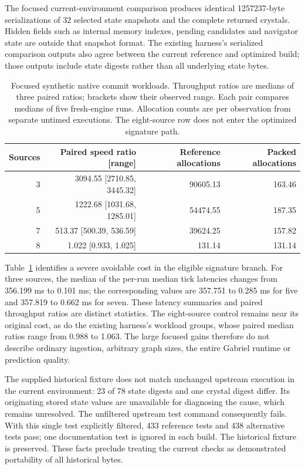 \documentclass[11pt,a4paper]{article}
\theoremstyle{definition}\newtheorem{definition}[theorem]{Definition}
\begin{document}
The focused current-environment comparison produces identical 1257237-byte serializations of 32 selected state snapshots and the complete returned crystals. Hidden fields such as internal memory indexes, pending candidates and navigator state are outside that snapshot format. The existing harness's serialized comparison outputs also agree between the current reference and optimized build; those outputs include state digests rather than all underlying state bytes.

\begin{table}[H]
\centering\small
\caption{Focused synthetic native commit workloads. Throughput ratios are medians of three paired ratios; brackets show their observed range. Each pair compares medians of five fresh-engine runs. Allocation counts are per observation from separate untimed executions. The eight-source row does not enter the optimized signature path.}\label{tab:packednative}
\begin{tabular}{rrrr}
\toprule
Sources & Paired speed ratio [range] & Reference allocations & Packed allocations\\
\midrule
3 & 3094.55 [2710.85, 3445.32] & 90605.13 & 163.46\\
5 & 1222.68 [1031.68, 1285.01] & 54474.55 & 187.35\\
7 & 513.37 [500.39, 536.59] & 39624.25 & 157.82\\
8 & 1.022 [0.933, 1.025] & 131.14 & 131.14\\
\bottomrule
\end{tabular}
\end{table}

Table~\ref{tab:packednative} identifies a severe avoidable cost in the eligible signature branch. For three sources, the median of the per-run median tick latencies changes from 356.199 ms to 0.101 ms; the corresponding values are 357.751 to 0.285 ms for five and 357.819 to 0.662 ms for seven. These latency summaries and paired throughput ratios are distinct statistics. The eight-source control remains near its original cost, as do the existing harness's workload groups, whose paired median ratios range from 0.988 to 1.063. The large focused gains therefore do not describe ordinary ingestion, arbitrary graph sizes, the entire Gabriel runtime or prediction quality.

The supplied historical fixture does not match unchanged upstream execution in the current environment: 23 of 78 state digests and one crystal digest differ. Its originating stored state values are unavailable for diagnosing the cause, which remains unresolved. The unfiltered upstream test command consequently fails. With this single test explicitly filtered, 433 reference tests and 438 alternative tests pass; one documentation test is ignored in each build. The historical fixture is preserved. These facts preclude treating the current checks as demonstrated portability of all historical bytes.
\end{document}
